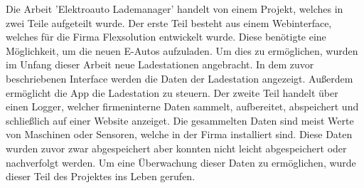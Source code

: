 Die Arbeit 'Elektroauto Lademanager' handelt von einem Projekt, welches in zwei Teile aufgeteilt wurde.
Der erste Teil besteht aus einem Webinterface, welches für die Firma Flexsolution entwickelt wurde. Diese benötigte eine Möglichkeit, um die neuen E-Autos aufzuladen. Um dies zu ermöglichen, wurden im Unfang dieser Arbeit neue Ladestationen angebracht. In dem zuvor beschriebenen Interface werden die Daten der Ladestation angezeigt. Außerdem ermöglicht die App die Ladestation zu steuern.
Der zweite Teil handelt über einen Logger, welcher firmeninterne Daten sammelt, aufbereitet, abspeichert und schließlich auf einer Website anzeiget. Die gesammelten Daten sind meist Werte von Maschinen oder Sensoren, welche in der Firma installiert sind. Diese Daten wurden zuvor zwar abgespeichert aber konnten nicht leicht abgespeichert oder nachverfolgt werden. Um eine Überwachung dieser Daten zu ermöglichen, wurde dieser Teil des Projektes ins Leben gerufen.
